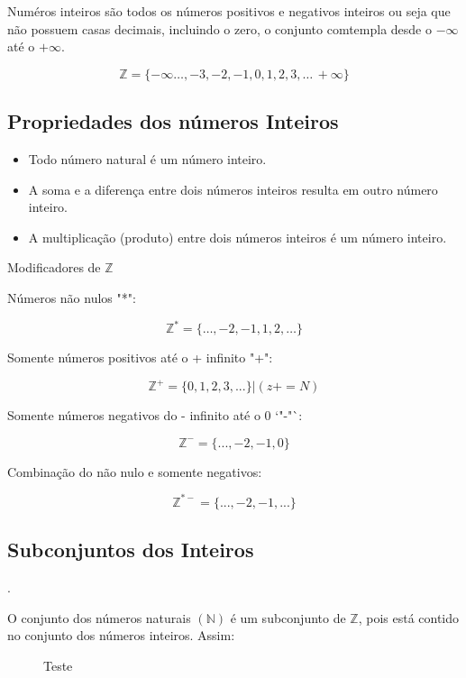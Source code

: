 \documentclass[letterpaper]{book}
\begin{document}
Numéros inteiros são todos os números positivos e negativos inteiros ou seja que não possuem casas decimais, incluindo o zero, o conjunto comtempla desde o \(-\infty\) até o \(+\infty\).

\[ \mathbb{Z}= \{-\infty \ldots,-3,  -2, -1, 0, 1, 2, 3, \ldots\, +\infty \} \]

\subsection{Propriedades dos números Inteiros}

\begin{itemize}
\item Todo número natural é um número inteiro.
\item A soma e a diferença entre dois números inteiros resulta em outro número inteiro.
\item A multiplicação (produto) entre dois números inteiros é um número inteiro.
\end{itemize}

Modificadores de \(\mathbb{Z}\)

Números não nulos "*":

\[\mathbb{Z}^{*} = \{\ldots, -2, -1, 1, 2, \ldots\}\]

Somente números positivos até o + infinito "+":

\[\mathbb{Z}^{+} = \{0, 1, 2, 3, ...\} | (z+ = N)\]

Somente números negativos do - infinito até o 0 `"-"`:

\[\mathbb{Z}^{-} = \{..., -2, -1, 0\}\]

Combinação do não nulo e somente negativos:

\[\mathbb{Z}^{*-} = \{..., -2, -1, ...\}\]

\subsection{Subconjuntos dos Inteiros}.

O conjunto dos números naturais \( (\mathbb{N}) \) é um subconjunto de \(\mathbb{Z}\), pois está contido no conjunto dos números inteiros. Assim:

\begin{figure}[H]
\centering
{}
\caption{Teste}
\end{figure}
\end{document}
